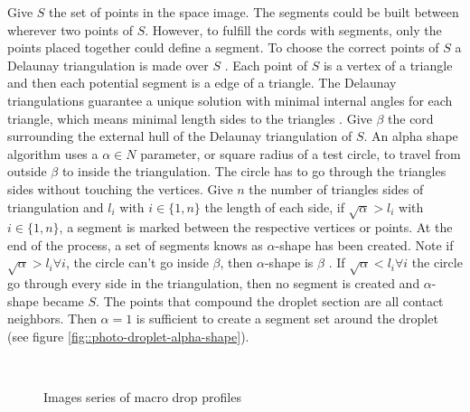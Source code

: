 \documentclass[12pt]{iopart}
\begin{document}
\begin{description}
                
Give $S$ the set of points in the space image. The segments could 
be built between wherever two points of $S$. However, to fulfill
 the cords with segments, only the points placed together could define
 a segment. To choose the correct points of $S$ a Delaunay triangulation
 is made over $S$ \cite{CGAL}. Each point of $S$ is a vertex
of a triangle and then each potential segment is a edge of a triangle. 
The Delaunay triangulations guarantee a unique solution with minimal
 internal angles for each triangle, which means  minimal
 length sides to the triangles \cite{BERG}.
 Give $\beta$ the cord surrounding the external hull of the Delaunay
 triangulation of $S$. An alpha shape algorithm uses a $\alpha \in N$ parameter,
 or square radius of a test circle, to travel from outside $\beta$ to inside
 the triangulation. The circle has to go through the triangles sides without touching the vertices. Give 
$n$ the number of triangles sides of triangulation
and $l_{i}$ with $i\in\{1,n\}$ the length of each side, if $\sqrt{\alpha} > l_{i}$ 
with $i \in\{1,n\}$, a segment is marked between the respective vertices or
 points. At the end of the process, a  set of segments knows as $\alpha$-shape has been created.
  Note if $\sqrt{\alpha} > l_{i} \forall i$, the circle can't go inside $\beta$, then $\alpha$-shape
 is $\beta$ \cite{CGAL}. If $\sqrt{\alpha} < l_{i} \forall i$ the circle go through
 every side in the triangulation,  then no segment is created and $\alpha$-shape
 became $S$. The points that compound the droplet section are all contact neighbors. Then $\alpha = 1$
 is sufficient to create a segment set around the droplet
 (see figure \ref{fig::photo-droplet-alpha-shape}). 
                                  
\begin{figure}[h!]
\begin{center}    
\\
\end{center}
\caption{{\small Images series of macro drop profiles}}
\label{fig::photo-results-droplet}
\end{figure}


\end{description}
\end{document}
